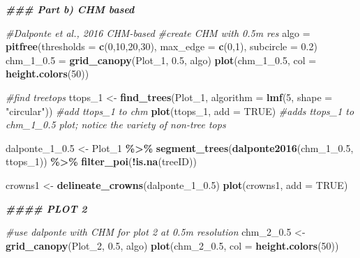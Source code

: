 \documentclass[
]{book}
\newenvironment{Shaded}{\begin{snugshade}}{\end{snugshade}}
\newcommand{\AttributeTok}[1]{\textcolor[rgb]{0.13,0.29,0.53}{#1}}
\newcommand{\CommentTok}[1]{\textcolor[rgb]{0.56,0.35,0.01}{\textit{#1}}}
\newcommand{\ConstantTok}[1]{\textcolor[rgb]{0.56,0.35,0.01}{#1}}
\newcommand{\DecValTok}[1]{\textcolor[rgb]{0.00,0.00,0.81}{#1}}
\newcommand{\DocumentationTok}[1]{\textcolor[rgb]{0.56,0.35,0.01}{\textbf{\textit{#1}}}}
\newcommand{\FloatTok}[1]{\textcolor[rgb]{0.00,0.00,0.81}{#1}}
\newcommand{\FunctionTok}[1]{\textcolor[rgb]{0.13,0.29,0.53}{\textbf{#1}}}
\newcommand{\NormalTok}[1]{#1}
\newcommand{\OtherTok}[1]{\textcolor[rgb]{0.56,0.35,0.01}{#1}}
\newcommand{\SpecialCharTok}[1]{\textcolor[rgb]{0.81,0.36,0.00}{\textbf{#1}}}
\newcommand{\StringTok}[1]{\textcolor[rgb]{0.31,0.60,0.02}{#1}}
\begin{document}
\begin{Shaded}
\begin{Highlighting}[]
\DocumentationTok{\#\#\# Part b) CHM based}

\CommentTok{\#Dalponte et al., 2016 CHM{-}based }
\CommentTok{\#create CHM with 0.5m res}
\NormalTok{algo }\OtherTok{=} \FunctionTok{pitfree}\NormalTok{(}\AttributeTok{thresholds =} \FunctionTok{c}\NormalTok{(}\DecValTok{0}\NormalTok{,}\DecValTok{10}\NormalTok{,}\DecValTok{20}\NormalTok{,}\DecValTok{30}\NormalTok{), }\AttributeTok{max\_edge =} \FunctionTok{c}\NormalTok{(}\DecValTok{0}\NormalTok{,}\DecValTok{1}\NormalTok{), }\AttributeTok{subcircle =} \FloatTok{0.2}\NormalTok{)}
\NormalTok{chm\_1\_0}\FloatTok{.5}  \OtherTok{=} \FunctionTok{grid\_canopy}\NormalTok{(Plot\_1, }\FloatTok{0.5}\NormalTok{, algo)}
\FunctionTok{plot}\NormalTok{(chm\_1\_0}\FloatTok{.5}\NormalTok{, }\AttributeTok{col =} \FunctionTok{height.colors}\NormalTok{(}\DecValTok{50}\NormalTok{))}

\CommentTok{\#find treetops}
\NormalTok{ttops\_1 }\OtherTok{\textless{}{-}} \FunctionTok{find\_trees}\NormalTok{(Plot\_1, }\AttributeTok{algorithm =} \FunctionTok{lmf}\NormalTok{(}\DecValTok{5}\NormalTok{, }\AttributeTok{shape =} \StringTok{"circular"}\NormalTok{))}
\CommentTok{\#add ttops\_1 to chm}
\FunctionTok{plot}\NormalTok{(ttops\_1, }\AttributeTok{add =} \ConstantTok{TRUE}\NormalTok{) }\CommentTok{\#adds ttops\_1 to chm\_1\_0.5 plot; notice the variety of non{-}tree tops}

\NormalTok{dalponte\_1\_0}\FloatTok{.5} \OtherTok{\textless{}{-}}\NormalTok{ Plot\_1 }\SpecialCharTok{\%\textgreater{}\%} 
  \FunctionTok{segment\_trees}\NormalTok{(}\FunctionTok{dalponte2016}\NormalTok{(chm\_1\_0}\FloatTok{.5}\NormalTok{, ttops\_1)) }\SpecialCharTok{\%\textgreater{}\%} 
  \FunctionTok{filter\_poi}\NormalTok{(}\SpecialCharTok{!}\FunctionTok{is.na}\NormalTok{(treeID))}

\NormalTok{crowns1 }\OtherTok{\textless{}{-}} \FunctionTok{delineate\_crowns}\NormalTok{(dalponte\_1\_0}\FloatTok{.5}\NormalTok{)}
\FunctionTok{plot}\NormalTok{(crowns1, }\AttributeTok{add =} \ConstantTok{TRUE}\NormalTok{)}

\DocumentationTok{\#\#\#\#  PLOT 2}

\CommentTok{\#use dalponte with CHM for plot 2 at 0.5m resolution }
\NormalTok{chm\_2\_0}\FloatTok{.5} \OtherTok{\textless{}{-}} \FunctionTok{grid\_canopy}\NormalTok{(Plot\_2, }\FloatTok{0.5}\NormalTok{, algo)}
\FunctionTok{plot}\NormalTok{(chm\_2\_0}\FloatTok{.5}\NormalTok{, }\AttributeTok{col =} \FunctionTok{height.colors}\NormalTok{(}\DecValTok{50}\NormalTok{))}


\end{Highlighting}
\end{Shaded}
\end{document}

